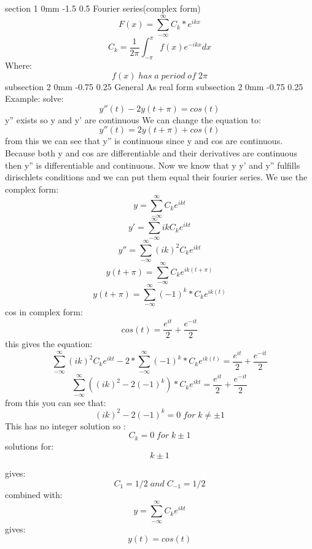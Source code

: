 \documentclass[a4paper,11pt]{article}
\makeatletter
\renewcommand{\section}{\@startsection
   {section}%
   {1}%
   {0mm}%
   {-1.5\baselineskip}%
   {0.5\baselineskip}%
   {\sffamily\bfseries\upshape\normalsize}}%
\renewcommand{\subsection}{\@startsection
   {subsection}%
   {2}%
   {0mm}%
   {-0.75\baselineskip}%
   {0.25\baselineskip}%
   {\rmfamily\normalfont\slshape\normalsize}}%
\makeatother
\begin{document}
\section{Fourier series(complex form)}
$$F(x)=\sum_{-\infty}^{\infty}C_k*e^{ikx}$$
$$C_k=\dfrac{1}{2\pi}\int_{-\pi}^{\pi}f(x)e^{-ikx}dx$$
Where:
	$$f(x)\; has\;a\;period \; of \; 2 \pi$$
\subsection{General}
As real form
\subsection{Example:}
solve:
$$y''(t)-2y(t+\pi)=cos(t)$$
y'' exists so y and y' are continuous
We can change the equation to:
$$y''(t)=2y(t+\pi)+cos(t)$$
from this we can see that y'' is continuous since y and cos are continuous. Because both y and cos are differentiable and their derivatives are continuous then y'' is differentiable and continuous.
Now we know that y y' and y'' fulfills dirischlets conditions and we can put them equal their fourier series.
We use the complex form:
$$y=\sum_{-\infty}^{\infty}C_ke^{ikt}$$
$$y'=\sum_{-\infty}^{\infty}ikC_ke^{ikt}$$
$$y''=\sum_{-\infty}^{\infty}(ik)^2C_ke^{ikt}$$
$$y(t+\pi)=\sum_{-\infty}^{\infty}C_ke^{ik(t+\pi)}$$
$$y(t+\pi)=\sum_{-\infty}^{\infty}(-1)^k*C_ke^{ik(t)}$$
cos in complex form:
$$cos(t)=\dfrac{e^{it}}{2}+\dfrac{e^{-it}}{2}$$
this gives the equation:
$$\sum_{-\infty}^{\infty}(ik)^2C_ke^{ikt}-2*\sum_{-\infty}^{\infty}(-1)^k*C_ke^{ik(t)}=\dfrac{e^{it}}{2}+\dfrac{e^{-it}}{2}$$
$$\sum_{-\infty}^{\infty}((ik)^2-2(-1)^k)*C_ke^{ikt}=\dfrac{e^{it}}{2}+\dfrac{e^{-it}}{2}$$
from this you can see that:
$$(ik)^2-2(-1)^k=0 \;for\; k\neq \pm 1$$
This has no integer solution so :
$$C_k=0 \; for \; k\pm1$$
solutions for:
$$k\pm1$$

gives:
$$C_1=1/2\; and\; C_{-1}=1/2$$
combined with:
$$y=\sum_{-\infty}^{\infty}C_ke^{ikt}$$
gives:
$$y(t)=cos(t)$$
\end{document}
